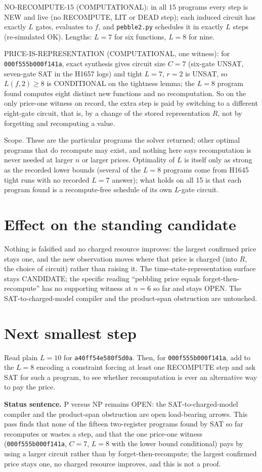 \documentclass[11pt]{article}
\begin{document}
NO-RECOMPUTE-15 (COMPUTATIONAL): in all 15 programs every step is NEW and live (no RECOMPUTE, LIT or DEAD step); each induced circuit has exactly $L$ gates, evaluates to $f$, and \texttt{pebble2.py} schedules it in exactly $L$ steps (re-simulated OK). Lengths: $L=7$ for six functions, $L=8$ for nine.

PRICE-IS-REPRESENTATION (COMPUTATIONAL, one witness): for \texttt{000f555b000f141a}, exact synthesis gives circuit size $C=7$ (six-gate UNSAT, seven-gate SAT in the H1657 logs) and tight $L=7$, $r=2$ is UNSAT, so $L(f,2)\ge 8$ is CONDITIONAL on the tightness lemma; the $L=8$ program found computes eight distinct new functions and no recomputation. So on the only price-one witness on record, the extra step is paid by switching to a different eight-gate circuit, that is, by a change of the stored representation $R$, not by forgetting and recomputing a value.

Scope. These are the particular programs the solver returned; other optimal programs that do recompute may exist, and nothing here says recomputation is never needed at larger $n$ or larger prices. Optimality of $L$ is itself only as strong as the recorded lower bounds (several of the $L=8$ programs come from H1645 tight runs with no recorded $L=7$ answer); what holds on all 15 is that each program found is a recompute-free schedule of its own $L$-gate circuit.

\section*{Effect on the standing candidate}
Nothing is falsified and no charged resource improves: the largest confirmed price stays one, and the new observation moves where that price is charged (into $R$, the choice of circuit) rather than raising it. The time-state-representation surface stays CANDIDATE; the specific reading ``pebbling price equals forget-then-recompute'' has no supporting witness at $n=6$ so far and stays OPEN. The SAT-to-charged-model compiler and the product-span obstruction are untouched.

\section*{Next smallest step}
Read plain $L=10$ for \texttt{a40ff54e580f5d0a}. Then, for \texttt{000f555b000f141a}, add to the $L=8$ encoding a constraint forcing at least one RECOMPUTE step and ask SAT for such a program, to see whether recomputation is ever an alternative way to pay the price.

\bigskip
\noindent\textbf{Status sentence.} P versus NP remains OPEN: the SAT-to-charged-model compiler and the product-span obstruction are open load-bearing arrows. This pass finds that none of the fifteen two-register programs found by SAT so far recomputes or wastes a step, and that the one price-one witness (\texttt{000f555b000f141a}, $C=7$, $L=8$ with the lower bound conditional) pays by using a larger circuit rather than by forget-then-recompute; the largest confirmed price stays one, no charged resource improves, and this is not a proof.
\end{document}
